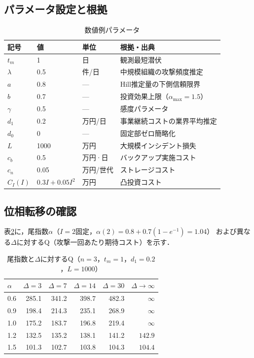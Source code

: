 \documentclass[12pt,a4paper]{article}
\theoremstyle{plain}
\theoremstyle{definition}
\theoremstyle{remark}
\begin{document}
\subsection{パラメータ設定と根拠}

\begin{table}[h]
\centering
\caption{数値例パラメータ}
\label{tab:params}
\begin{tabular}{@{}lllp{55mm}@{}}
\toprule
記号 & 値 & 単位 & 根拠・出典 \\
\midrule
$t_m$ & 1 & 日 & 観測最短潜伏~\cite{mandiant2023}  \\
$\lambda$ & 0.5 & 件/日 & 中規模組織の攻撃頻度推定~\cite{ibm2023} \\
$a$ & 0.8 & --- & Hill推定量の下側信頼限界 \\
$b$ & 0.7 & --- & 投資効果上限（$\alpha_{\max}=1.5$） \\
$\gamma$ & 0.5 & --- & 感度パラメータ \\
$d_1$ & 0.2 & 万円/日 & 事業継続コストの業界平均推定 \\
$d_0$ & 0 & --- & 固定部ゼロ簡略化 \\
$L$ & 1000 & 万円 & 大規模インシデント損失 \\
$c_b$ & 0.5 & 万円·日 & バックアップ実施コスト \\
$c_n$ & 0.05 & 万円/世代 & ストレージコスト \\
$C_I(I)$ & $0.3I+0.05I^2$ & 万円 & 凸投資コスト \\
\bottomrule
\end{tabular}
\end{table}

\subsection{位相転移の確認}

表\ref{tab:phase}に，尾指数$\alpha$（$I=2$固定，$\alpha(2)=0.8+0.7(1-e^{-1})=1.04$）
および異なる$\Delta$に対するQ（攻撃一回あたり期待コスト）を示す．

\begin{table}[h]
\centering
\caption{尾指数と$\Delta$に対するQ（$n=3$，$t_m=1$，$d_1=0.2$，$L=1000$）}
\label{tab:phase}
\begin{tabular}{@{}lrrrrr@{}}
\toprule
$\alpha$ & $\Delta=3$ & $\Delta=7$ & $\Delta=14$ & $\Delta=30$ & $\Delta\to\infty$ \\
\midrule
0.6 & 285.1 & 341.2 & 398.7 & 482.3 & $\infty$ \\
0.9 & 198.4 & 214.3 & 235.1 & 268.9 & $\infty$ \\
1.0 & 175.2 & 183.7 & 196.8 & 219.4 & $\infty$ \\
1.2 & 132.5 & 135.2 & 138.1 & 141.2 & $142.9$ \\
1.5 & 101.3 & 102.7 & 103.8 & 104.3 & $104.4$ \\
\bottomrule
\end{tabular}
\end{table}
\end{document}
